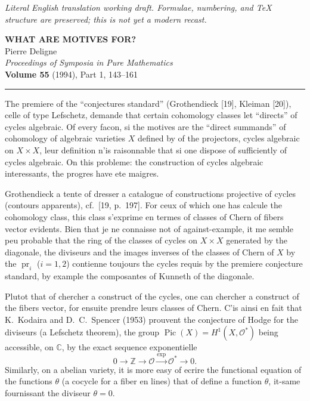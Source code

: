 \documentclass[11pt,a4paper]{article}
\theoremstyle{plain}
\theoremstyle{definition}
\DeclareMathOperator{\Pic}{Pic}
\DeclareMathOperator{\pr}{pr}
\newcommand{\Z}{\mathbb{Z}}
\newcommand{\C}{\mathbb{C}}
\begin{document}
\begin{center}\small\emph{Literal English translation working draft. Formulae, numbering, and TeX structure are preserved; this is not yet a modern recast.}\end{center}
\vspace{0.5em}


\begin{center}
{\Large\textbf{WHAT ARE MOTIVES FOR?}}\\[1em]
{\large Pierre Deligne}\\[1em]
\textit{Proceedings of Symposia in Pure Mathematics}\\
\textbf{Volume 55} (1994), Part 1, 143--161
\end{center}

\vspace{1em}
\noindent\rule{\textwidth}{0.4pt}
\vspace{0.5em}

The premiere of the ``conjectures standard'' (Grothendieck [19], Kleiman [20]),
celle of type Lefschetz, demande that certain cohomology classes let
``directs'' of cycles algebraic. Of every facon, si the motives are the ``direct summands'' of cohomology of algebraic varieties $X$ defined by of the projectors, cycles algebraic on
$X \times X$, leur definition n'is raisonnable that si one dispose of sufficiently of cycles
algebraic. On this probleme: the construction of cycles algebraic
interessants, the progres have ete maigres.

Grothendieck a tente of dresser a catalogue of constructions projective of
cycles (contours apparents), cf.~[19, p.~197]. For ceux of which one has calcule the
cohomology class, this class s'exprime en termes of classes of Chern of
fibers vector evidents. Bien that je ne connaisse not of against-example, it me
semble peu probable that the ring of the classes of cycles on $X \times X$ generated
by the diagonale, the diviseurs and the images inverses of the classes of Chern of $X$
by the $\pr_i$ ($i = 1, 2$) contienne toujours the cycles requis by the premiere
conjecture standard, by example the composantes of Kunneth of the diagonale.

Plutot that of chercher a construct of the cycles, one can chercher a construct
of the fibers vector, for ensuite prendre leurs classes of Chern. C'is ainsi
en fait that K.~Kodaira and D.~C.~Spencer (1953) prouvent the conjecture of
Hodge for the diviseurs (a Lefschetz theorem), the group $\Pic(X) =
H^1(X, \mathcal{O}^*)$ being accessible, on $\C$, by the exact sequence exponentielle
$$
0 \to \Z \to \mathcal{O} \xrightarrow{\exp} \mathcal{O}^* \to 0.
$$
Similarly, on a abelian variety, it is more easy of ecrire the functional equation of the functions $\theta$ (a cocycle for a fiber en lines) that of define a function $\theta$, it-same fournissant the diviseur $\theta = 0$.
\end{document}

